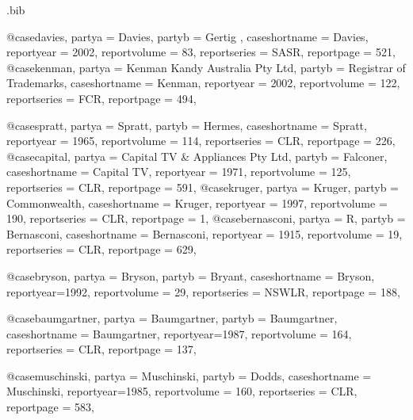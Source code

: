 

\begin{filecontents*}[overwrite]{\jobname.bib}




@case{davies,	partya =  {Davies},	partyb =  {Gertig },	caseshortname =  {Davies},	reportyear =  {2002},	reportvolume =  {83},		reportseries =  {SASR},	reportpage =  {521},		}
@case{kenman,	partya =  {Kenman Kandy Australia Pty Ltd},	partyb =  {Registrar of Trademarks},	caseshortname =  {Kenman},	reportyear =  {2002},	reportvolume =  {122},		reportseries =  {FCR},	reportpage =  {494},		}

@case{spratt,	partya =  {Spratt},	partyb =  {Hermes},	caseshortname =  {Spratt},	reportyear =  {1965},	reportvolume =  {114},		reportseries =  {CLR},	reportpage =  {226},		}
@case{capital,	partya =  {Capital TV \& Appliances Pty Ltd},	partyb =  {Falconer},	caseshortname =  {Capital TV},	reportyear =  {1971},	reportvolume =  {125},		reportseries =  {CLR},	reportpage =  {591},		}
@case{kruger,	partya =  {Kruger},	partyb =  {Commonwealth},	caseshortname =  {Kruger},	reportyear =  {1997},	reportvolume =  {190},		reportseries =  {CLR},	reportpage =  {1},		}
@case{bernasconi,	partya =  {R},	partyb =  {Bernasconi},	caseshortname =  {Bernasconi},	reportyear =  {1915},	reportvolume =  {19},		reportseries =  {CLR},	reportpage =  {629},		}


@case{bryson,
  partya = {Bryson}, 
  partyb = {Bryant},
  caseshortname = {Bryson},
  reportyear={1992},
  reportvolume = {29},
  reportseries = {NSWLR},
  reportpage = {188},
	}





@case{baumgartner,
  partya = {Baumgartner}, 
  partyb = {Baumgartner},
  caseshortname = {Baumgartner},
  reportyear={1987},
  reportvolume = {164},
  reportseries = {CLR},
  reportpage = {137},
	}




@case{muschinski,
  partya = {Muschinski}, 
  partyb = {Dodds},
  caseshortname = {Muschinski},
  reportyear={1985},
  reportvolume = {160},
  reportseries = {CLR},
  reportpage = {583},
	}



\end{filecontents*}
